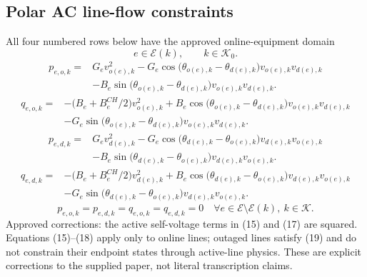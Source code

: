\documentclass{article}
\begin{document}
\subsection*{Polar AC line-flow constraints}
All four numbered rows below have the approved online-equipment domain
\[
 e\in\mathcal E(k),\qquad k\in\mathcal K_0.
\]
\begin{equation}
\begin{aligned}
p_{e,o,k}={}&G_ev_{o(e),k}^{2}
-G_e\cos\bigl(\theta_{o(e),k}-\theta_{d(e),k}\bigr)v_{o(e),k}v_{d(e),k}\\
&-B_e\sin\bigl(\theta_{o(e),k}-\theta_{d(e),k}\bigr)v_{o(e),k}v_{d(e),k}.
\end{aligned}\tag{15}
\end{equation}
\begin{equation}
\begin{aligned}
q_{e,o,k}={}&-\bigl(B_e+B_e^{CH}/2\bigr)v_{o(e),k}^{2}
+B_e\cos\bigl(\theta_{o(e),k}-\theta_{d(e),k}\bigr)v_{o(e),k}v_{d(e),k}\\
&-G_e\sin\bigl(\theta_{o(e),k}-\theta_{d(e),k}\bigr)v_{o(e),k}v_{d(e),k}.
\end{aligned}\tag{16}
\end{equation}
\begin{equation}
\begin{aligned}
p_{e,d,k}={}&G_ev_{d(e),k}^{2}
-G_e\cos\bigl(\theta_{d(e),k}-\theta_{o(e),k}\bigr)v_{d(e),k}v_{o(e),k}\\
&-B_e\sin\bigl(\theta_{d(e),k}-\theta_{o(e),k}\bigr)v_{d(e),k}v_{o(e),k}.
\end{aligned}\tag{17}
\end{equation}
\begin{equation}
\begin{aligned}
q_{e,d,k}={}&-\bigl(B_e+B_e^{CH}/2\bigr)v_{d(e),k}^{2}
+B_e\cos\bigl(\theta_{d(e),k}-\theta_{o(e),k}\bigr)v_{d(e),k}v_{o(e),k}\\
&-G_e\sin\bigl(\theta_{d(e),k}-\theta_{o(e),k}\bigr)v_{d(e),k}v_{o(e),k}.
\end{aligned}\tag{18}
\end{equation}
\begin{equation}
p_{e,o,k}=p_{e,d,k}=q_{e,o,k}=q_{e,d,k}=0
\quad\forall e\in\mathcal E\setminus\mathcal E(k),\ k\in\mathcal K.
\tag{19}
\end{equation}
Approved corrections: the active self-voltage terms in (15) and (17) are squared. Equations (15)--(18) apply only to online lines; outaged lines satisfy (19) and do not constrain their endpoint states through active-line physics. These are explicit corrections to the supplied paper, not literal transcription claims.
\end{document}
